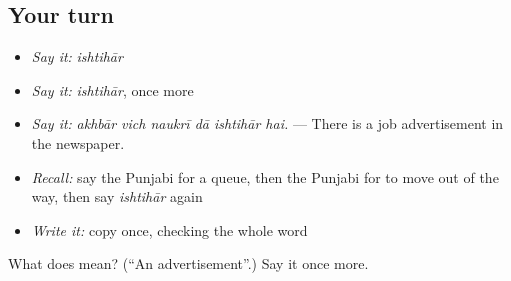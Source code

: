 \subsection*{Your turn}
\begin{itemize}
\raggedright
  \item \emph{Say it:} \emph{ishtihār}
  \item \emph{Say it:} \emph{ishtihār}, once more
  \item \emph{Say it:} \emph{akhbār vich naukrī dā ishtihār hai.} — There is a job advertisement in the newspaper.
  \item \emph{Recall:} say the Punjabi for a queue, then the Punjabi for to move out of the way, then say \emph{ishtihār} again
  \item \emph{Write it:} copy \textbf{} once, checking the whole word
\end{itemize}

\begin{tcolorbox}[breakable,colback=teal!4,colframe=teal!35!black,title={Before you move on}]
What does  mean? (\textquotedblleft{}An advertisement\textquotedblright{}.) Say it once more.
\end{tcolorbox}
